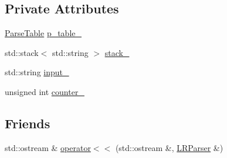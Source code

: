 \subsection*{Private Attributes}
\begin{DoxyCompactItemize}
\item 
\hyperlink{classParseTable}{Parse\-Table} \hyperlink{classLRParser_a111f4dd04eb42896c7c31bd1a255a58b}{p\-\_\-table\-\_\-}
\item 
std\-::stack$<$ std\-::string $>$ \hyperlink{classLRParser_a98af41152079cb4f2fe7f280629cf18c}{stack\-\_\-}
\item 
std\-::string \hyperlink{classLRParser_a8dc38b1c7c3a3aa80abbd48ee2364319}{input\-\_\-}
\item 
unsigned int \hyperlink{classLRParser_acd3eab842429e90bd7dc0433274e0a37}{counter\-\_\-}
\end{DoxyCompactItemize}
\subsection*{Friends}
\begin{DoxyCompactItemize}
\item 
std\-::ostream \& \hyperlink{classLRParser_a9f53bcd94244f30103c9756aabf51d38}{operator$<$$<$} (std\-::ostream \&, \hyperlink{classLRParser}{L\-R\-Parser} \&)
\end{DoxyCompactItemize}


